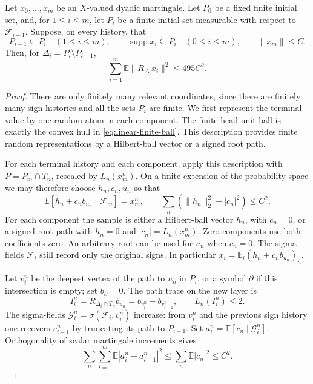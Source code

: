 \begin{theorem}\label{thm:linear-predictable-energy}
Let \(x_0,\ldots,x_m\) be an \(X\)-valued dyadic martingale.  Let \(P_0\)
be a fixed finite initial set, and, for \(1\le i\le m\), let \(P_i\)
be a finite initial set measurable with respect to \(\mathcal F_{i-1}\).
Suppose, on every history, that
\[
 P_{i-1}\subseteq P_i\quad(1\le i\le m),\qquad
 \operatorname{supp}x_i\subseteq P_i\quad(0\le i\le m),\qquad \|x_m\|\le C.
\]
Then, for \(\Delta_i=P_i\setminus P_{i-1}\),
\begin{equation}\label{eq:linear-energy-495}
 \sum_{i=1}^m\mathbb E\|R_{\Delta_i}x_i\|^2\le495C^2.
\end{equation}
\end{theorem}

\begin{proof}
There are only finitely many relevant coordinates, since there are
finitely many sign histories and all the sets \(P_i\) are finite.
We first represent the terminal value by one random atom in each
component.  The finite-head unit ball is exactly the convex hull in
\eqref{eq:linear-finite-ball}.  This description provides finite random
representations by a Hilbert-ball vector or a signed root path.

For each terminal history and each component, apply this description
with \(P=P_m\cap T_n\), rescaled by \(L_n(x_m^n)\).  On a finite
extension of the probability space we may therefore choose \(h_n,c_n,u_n\)
so that
\begin{equation}\label{eq:linear-one-atom}
 \mathbb E[h_n+c_nb_{u_n}\mid\mathcal F_m]=x_m^n,
 \qquad
 \sum_n(\|h_n\|_2^2+|c_n|^2)\le C^2.
\end{equation}
For each component the sample is either a Hilbert-ball vector
\(h_n\), with \(c_n=0\), or a signed root path with \(h_n=0\) and
\(|c_n|=L_n(x_m^n)\).  Zero components use both coefficients zero.
An arbitrary root can be used for \(u_n\) when \(c_n=0\).  The
sigma-fields \(\mathcal F_i\) still record only the original signs.
In particular \(x_i=\mathbb E_i(h_n+c_nb_{u_n})_n\).

Let \(v_i^n\) be the deepest vertex of the path to \(u_n\) in \(P_i\),
or a symbol \(\partial\) if this intersection is empty; set
\(b_\partial=0\).  The path trace on the new layer is
\[
 I_i^n=R_{\Delta_i\cap T_n}b_{u_n}=b_{v_i^n}-b_{v_{i-1}^n},
 \qquad L_n(I_i^n)\le2.
\]
The sigma-fields \(\mathcal G_i^n=\sigma(\mathcal F_i,v_i^n)\) increase:
from \(v_i^n\) and the previous sign history one recovers \(v_{i-1}^n\)
by truncating its path to \(P_{i-1}\).  Set
\(a_i^n=\mathbb E[c_n\mid\mathcal G_i^n]\).  Orthogonality of scalar
martingale increments gives
\begin{equation}\label{eq:linear-coefficient-energy}
 \sum_n\sum_{i=1}^m\mathbb E|a_i^n-a_{i-1}^n|^2
 \le\sum_n\mathbb E|c_n|^2\le C^2.
\end{equation}


\end{proof}
